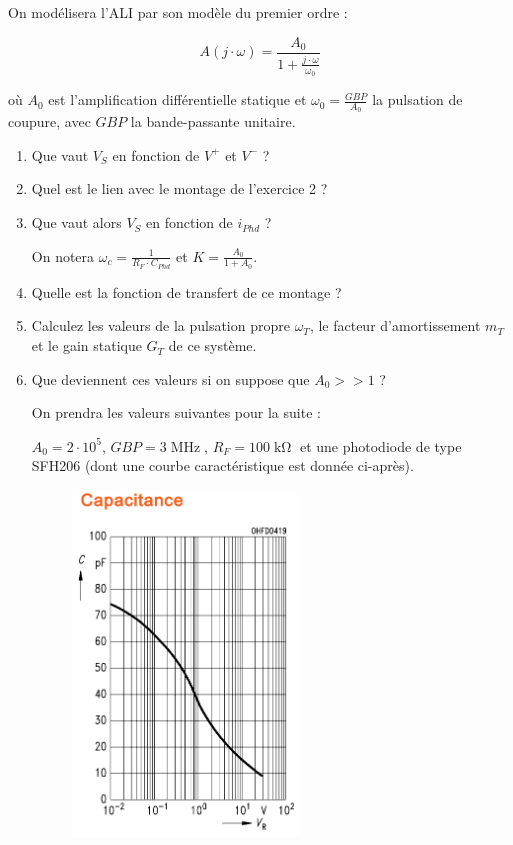 On modélisera l'ALI par son modèle du premier ordre :

$$A(j \cdot \omega) = \frac{A_0}{1 + \frac{j \cdot \omega}{\omega_0}}$$

où $A_0$ est l'amplification différentielle statique et $\omega_0 = \frac{GBP}{A_0}$ la pulsation de coupure, avec $GBP$ la bande-passante unitaire.

\begin{enumerate}
	\item Que vaut $V_S$ en fonction de $V^+$ et $V^-$ ?
	\item Quel est le lien avec le montage de l'exercice 2 ?
	\item Que vaut alors $V_S$ en fonction de $i_{Phd}$ ?
	
	On notera $\omega_c = \frac{1}{R_F \cdot C_{Phd}}$ et $K = \frac{A_0}{1 + A_0}$.
	
	\item Quelle est la fonction de transfert de ce montage ?
	\item Calculez les valeurs de la pulsation propre $\omega_T$, le facteur d'amortissement $m_T$ et le gain statique $G_T$ de ce système.
	\item Que deviennent ces valeurs si on suppose que $A_0 >> 1$ ?


	On prendra les valeurs suivantes pour la suite :
	
	$A_0 = 2 \cdot 10^5$, $GBP = 3\operatorname{MHz}$, $R_F = 100\operatorname{k\Omega}$ et une photodiode de type SFH206 (dont une courbe caractéristique est donnée ci-après).
	
\begin{figure}[!h]
	\centering
	\includegraphics[width=6cm]{images/TD/SFH206_capa.png}
\end{figure}
	

\end{enumerate}

